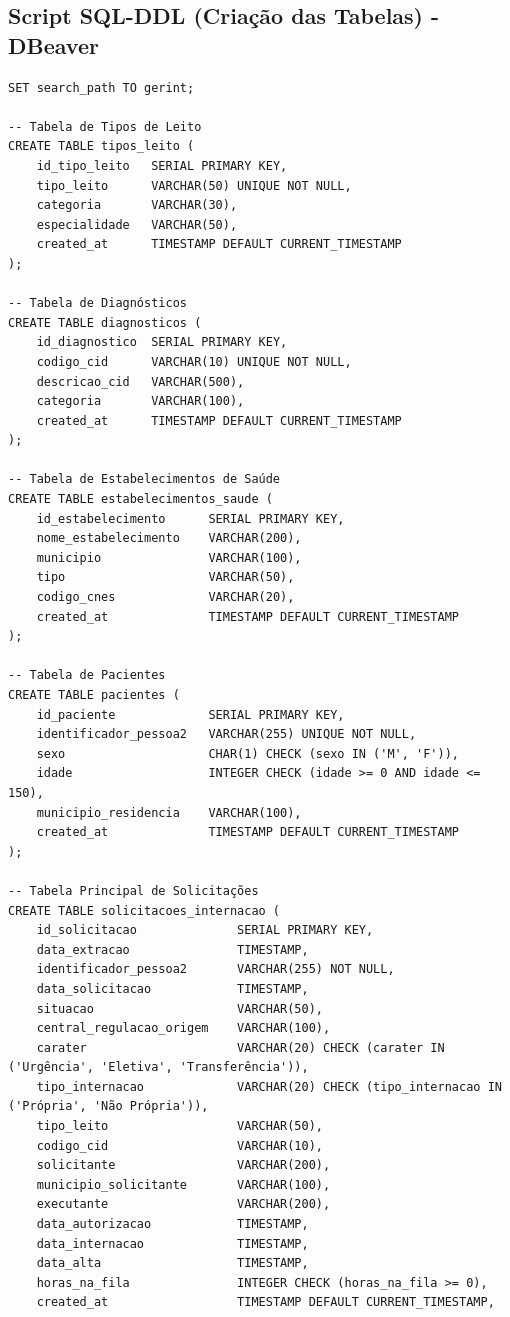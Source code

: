 \documentclass[12pt,a4paper]{article}
\begin{document}
\subsection{Script SQL-DDL (Criação das Tabelas) - DBeaver}

\begin{lstlisting}[style=sqlstyle, caption=Criação do Schema e Tabelas]
SET search_path TO gerint;

-- Tabela de Tipos de Leito
CREATE TABLE tipos_leito (
    id_tipo_leito   SERIAL PRIMARY KEY,
    tipo_leito      VARCHAR(50) UNIQUE NOT NULL,
    categoria       VARCHAR(30),
    especialidade   VARCHAR(50),
    created_at      TIMESTAMP DEFAULT CURRENT_TIMESTAMP
);

-- Tabela de Diagnósticos
CREATE TABLE diagnosticos (
    id_diagnostico  SERIAL PRIMARY KEY,
    codigo_cid      VARCHAR(10) UNIQUE NOT NULL,
    descricao_cid   VARCHAR(500),
    categoria       VARCHAR(100),
    created_at      TIMESTAMP DEFAULT CURRENT_TIMESTAMP
);

-- Tabela de Estabelecimentos de Saúde
CREATE TABLE estabelecimentos_saude (
    id_estabelecimento      SERIAL PRIMARY KEY,
    nome_estabelecimento    VARCHAR(200),
    municipio               VARCHAR(100),
    tipo                    VARCHAR(50),
    codigo_cnes             VARCHAR(20),
    created_at              TIMESTAMP DEFAULT CURRENT_TIMESTAMP
);

-- Tabela de Pacientes
CREATE TABLE pacientes (
    id_paciente             SERIAL PRIMARY KEY,
    identificador_pessoa2   VARCHAR(255) UNIQUE NOT NULL,
    sexo                    CHAR(1) CHECK (sexo IN ('M', 'F')),
    idade                   INTEGER CHECK (idade >= 0 AND idade <= 150),
    municipio_residencia    VARCHAR(100),
    created_at              TIMESTAMP DEFAULT CURRENT_TIMESTAMP
);

-- Tabela Principal de Solicitações
CREATE TABLE solicitacoes_internacao (
    id_solicitacao              SERIAL PRIMARY KEY,
    data_extracao               TIMESTAMP,
    identificador_pessoa2       VARCHAR(255) NOT NULL,
    data_solicitacao            TIMESTAMP,
    situacao                    VARCHAR(50),
    central_regulacao_origem    VARCHAR(100),
    carater                     VARCHAR(20) CHECK (carater IN ('Urgência', 'Eletiva', 'Transferência')),
    tipo_internacao             VARCHAR(20) CHECK (tipo_internacao IN ('Própria', 'Não Própria')),
    tipo_leito                  VARCHAR(50),
    codigo_cid                  VARCHAR(10),
    solicitante                 VARCHAR(200),
    municipio_solicitante       VARCHAR(100),
    executante                  VARCHAR(200),
    data_autorizacao            TIMESTAMP,
    data_internacao             TIMESTAMP,
    data_alta                   TIMESTAMP,
    horas_na_fila               INTEGER CHECK (horas_na_fila >= 0),
    created_at                  TIMESTAMP DEFAULT CURRENT_TIMESTAMP,
    

\end{lstlisting}
\end{document}
